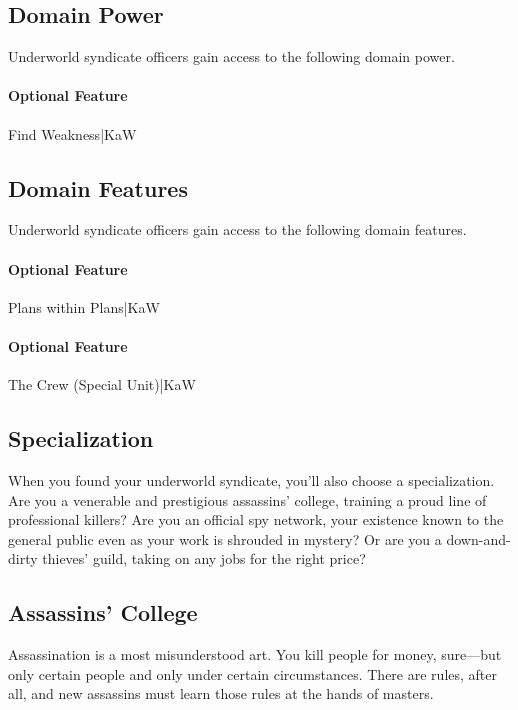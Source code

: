 \documentclass[10pt,a4paper,twoside,bg=print,twocolumn,openany,nodeprecatedcode]{dndbook}
\begin{document}
\subsection{Domain Power}
Underworld syndicate officers gain access to the following domain power.

\paragraph{Optional Feature}
Find Weakness|KaW

\subsection{Domain Features}
Underworld syndicate officers gain access to the following domain features.

\paragraph{Optional Feature}
Plans within Plans|KaW

\paragraph{Optional Feature}
The Crew (Special Unit)|KaW

\subsection{Specialization}
When you found your underworld syndicate, you'll also choose a specialization. Are you a venerable and prestigious assassins' college, training a proud line of professional killers? Are you an official spy network, your existence known to the general public even as your work is shrouded in mystery? Or are you a down-and-dirty thieves' guild, taking on any jobs for the right price?

\subsection{Assassins' College}
Assassination is a most misunderstood art. You kill people for money, sure—but only certain people and only under certain circumstances. There are rules, after all, and new assassins must learn those rules at the hands of masters.

{\par \vspace { 9pt plus 3pt minus 3pt } \noindent  {} \nopagebreak }
\end{document}
